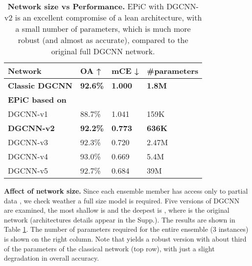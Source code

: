 \documentclass[10pt,twocolumn]{article}
\begin{document}
\begin{table}[!ptbh]
  \centering
    \begin{tabular}{p{2.8cm} || p{1.0cm} p{1.0cm} p{1.5cm}}
    \hline
    Network & OA ↑ & mCE ↓ & \#parameters\\
    \hline
    \bf{Classic DGCNN} & \bf{92.6\%} & \bf{1.000} & \bf{1.8M}\\
    \hline
    \bf{EPiC based on} &  &  & \\
    \hline
 DGCNN-v1 & 88.7\% & 1.041 & 159K\\
    \bf{DGCNN-v2} & \bf{92.2\%} & \bf{0.773} & \bf{636K}\\ 
    DGCNN-v3 & 92.3\% & 0.720 & 2.47M\\ 
    DGCNN-v4 & 93.0\% & 0.669 & 5.4M\\
    DGCNN-v5 & 92.7\% & 0.684 & 39M\\  \hline
  \end{tabular}
  \caption{{\bf Network size vs Performance. 
  } EPiC with DGCNN-v2 is an excellent compromise of a lean architecture, with a small number of parameters, which is  much more robust (and almost as accurate), compared to the original full DGCNN network.}
  \label{table:shallowness}
\end{table}

{\bf Affect of network size.}
Since each ensemble member has access only to partial data , we check weather a full size model is required. Five  versions of DGCNN are examined, the most shallow is  and the deepest is , where  is the original network (architectures details appear in the Supp.). The results are shown in Table \ref{table:shallowness}. The number of parameters required for the entire ensemble (3 instances) is shown on the right column. Note that  yields a robust version with about third of the parameters of the classical network (top row), with just a slight degradation in overall accuracy.
\end{document}
